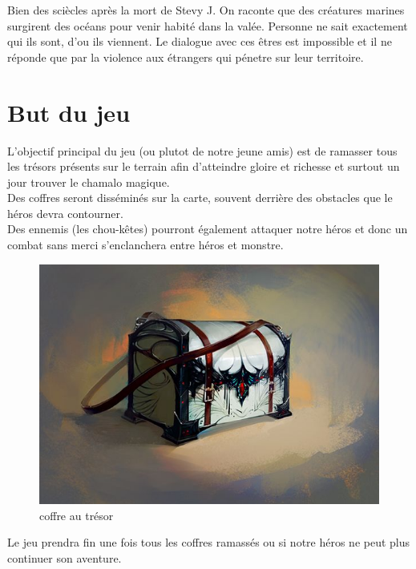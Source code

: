 \documentclass[a4paper 12pts]{article}
\begin{document}
\vspace{0.8 cm}

Bien des sciècles après la mort de Stevy J. On raconte que des créatures marines surgirent des océans pour venir habité dans la valée.
Personne ne sait exactement qui ils sont, d'ou ils viennent. Le dialogue avec ces êtres est impossible et il ne réponde que par la violence aux étrangers qui
pénetre sur leur territoire.




\section{But du jeu}


\vspace{2cm}

L'objectif principal du jeu (ou plutot de notre jeune amis) est de ramasser tous les trésors présents 
sur le terrain afin d'atteindre gloire et richesse et surtout un jour trouver le chamalo magique.\\

Des coffres seront disséminés sur la carte, souvent derrière des obstacles que le héros devra contourner.\\ 
Des ennemis (les chou-kêtes) pourront également attaquer notre héros et donc un combat sans merci s'enclanchera entre héros et monstre.\\


\begin{figure}[h]
   \includegraphics[width=350pt]{Illustration/coffre.jpg}
\caption{coffre au trésor}
\end{figure}


Le jeu prendra fin une fois tous les coffres ramassés ou si notre héros ne peut plus continuer son aventure.
\end{document}
